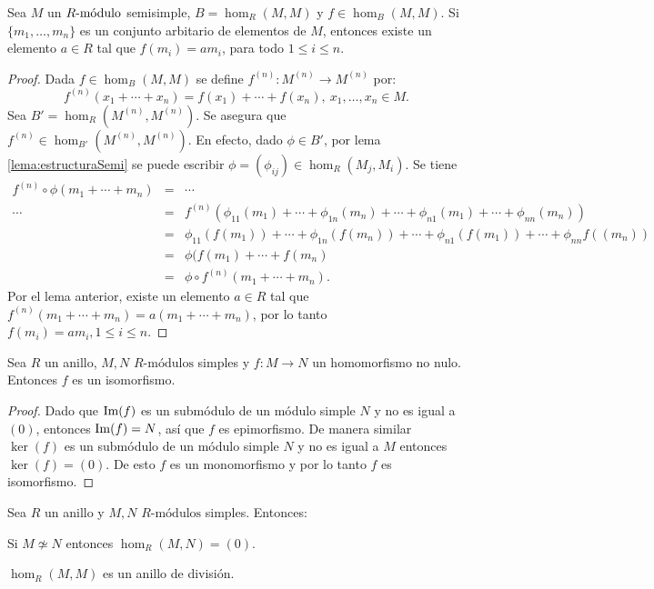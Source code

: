\begin{teorema}
Sea $M$ un $\modulo{R}$ semisimple, $B= \hom_R(M,M)$ y $f \in  \hom_B(M,M)$. Si $\{ m_1, \dots, m_n \}$ es un conjunto arbitario de elementos de $M$, entonces existe un elemento $a \in R$ tal que $f(m_i) = am_i$, para todo $1\leq i \leq n$.
\end{teorema}
\begin{proof}
Dada $f \in \hom_B(M,M)$ se define $f^{(n)} \colon M^{(n)} \to M^{(n)}$ por: \[ f^{(n)}(x_1 + \cdots + x_n) = f(x_1) + \cdots+ f(x_n), \ x_1, \dots, x_n \in M. \]
Sea $B' = \hom_R(M^{(n)}, M^{(n)})$. Se asegura que $f^{(n)} \in \hom_{B'}(M^{(n)}, M^{(n)})$. En efecto, dado $\phi \in B'$, por lema \ref{lema:estructuraSemi} se puede escribir $\phi = (\phi_{ij}) \in \hom_R(M_j,M_i)$. Se tiene
\begin{eqnarray*}
f^{(n)} \circ \phi(m_1+\cdots +m_n) &=& \cdots \\ 
\cdots &=& f^{(n)}(\phi_{11}(m_1) +\cdots+\phi_{1n}(m_n)+\cdots+\phi_{n1}(m_1)+\cdots+\phi_{nn}(m_n))  \\
&=& \phi_{11}(f(m_1)) + \cdots + \phi_{1n}(f(m_n)) + \cdots + \phi_{n1}(f(m_1 )) + \cdots + \phi_{nn}f((m_n))   \\
&=& \phi(f(m_1) + \cdots + f(m_n)  \\
&=&\phi \circ f^{(n)}(m_1 + \cdots + m_n).
\end{eqnarray*}
Por el lema anterior, existe un elemento $a \in R$ tal que $f^{(n)}(m_1+\cdots+m_n) = a(m_1+\cdots+m_n)$, por lo tanto $f(m_i) = am_i, 1\leq i \leq n$.
\end{proof}
\begin{lema}
Sea $R$ un anillo, $M,N$ $R\mbox{-módulos}$ simples y $f \colon M \to N$ un homomorfismo no nulo. Entonces $f$ es un isomorfismo.
\end{lema}
\begin{proof}
Dado que $\Ima(f)$ es un submódulo de un módulo simple $N$ y no es igual a $(0)$, entonces $\Ima(f) = N$, así que $f$ es epimorfismo. De manera similar $\ker(f)$ es un submódulo de un módulo simple $N$ y no es igual a $M$ entonces $\ker(f) = (0)$. De esto $f$ es un monomorfismo y por lo tanto $f$ es isomorfismo.
\end{proof}
\begin{corolario}
Sea $R$ un anillo y $M,N$ $R\mbox{-módulos}$ simples. Entonces:
\begin{bulletList}
\item Si $M \not\simeq N$ entonces $\hom_R(M,N) = (0)$.
\item $\hom_R(M,M)$ es un anillo de división. 
\end{bulletList}
\end{corolario}
